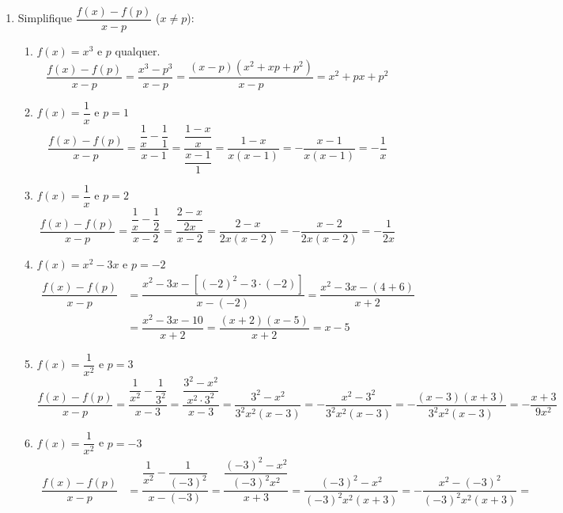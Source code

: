 \begin{enumerate}
\begin{enumerate}
	\end{enumerate}
\item %
	Simplifique $\dfrac{f(x)-f(p)}{x-p}$ ($x\neq p$):
	\begin{enumerate}
		\addtocounter{enumii}{8}
		\item %
		$f(x)=x^3$ e $p$ qualquer.
		\begin{equation*}
		\dfrac{f(x)-f(p)}{x-p}=\dfrac{x^3-p^3}{x-p}=\dfrac{(x-p)(x^2+xp+p^2)}{x-p}=x^2+px+p^2		
		\end{equation*}
		\item %
		$f(x)=\dfrac{1}{x}$ e $p=1$
		\begin{equation*}
		\dfrac{f(x)-f(p)}{x-p} = \dfrac{\dfrac{1}{x}-\dfrac{1}{1}}{x-1	}=\dfrac{\dfrac{1-x}{x}}{\dfrac{x-1}{1}}=\dfrac{1-x}{x(x-1)}=-\dfrac{x-1}{x(x-1)}=-\dfrac{1}{x}
		\end{equation*}
		\addtocounter{enumii}{1}
		\item %
		$f(x)=\dfrac{1}{x}$ e $p=2$
		\begin{equation*}		
		\dfrac{f(x)-f(p)}{x-p} = \dfrac{\dfrac{1}{x}-\dfrac{1}{2}}{x-2}=\dfrac{\dfrac{2-x}{2x}}{x-2}=\dfrac{2-x}{2x(x-2)}=-\dfrac{x-2}{2x(x-2)}=-\dfrac{1}{2x}
		\end{equation*}
		\item %
		$f(x)=x^2-3x$ e $p=-2$
		\begin{equation*}
		\begin{split}
		\dfrac{f(x)-f(p)}{x-p}&= \dfrac{x^2-3x-[(-2)^2-3\cdot(-2)]}{x-(-2)}=\dfrac{x^2-3x-(4+6)}{x+2}\\
		 					   &= \dfrac{x^2-3x-10}{x+2}=\dfrac{(x+2)(x-5)}{x+2}=x-5
		\end{split}
		\end{equation*}
		\item %
		$f(x)=\dfrac{1}{x^2}$ e $p=3$
		\begin{equation*}
		\dfrac{f(x)-f(p)}{x-p} = \dfrac{\dfrac{1}{x^2}-\dfrac{1}{3^2}}{x-3}=\dfrac{\dfrac{3^2-x^2}{x^2\cdot3^2}}{x-3}=\dfrac{3^2-x^2}{3^2x^2(x-3)}=-\dfrac{x^2-3^2}{3^2x^2(x-3)}=-\dfrac{(x-3)(x+3)}{3^2x^2(x-3)}=-\dfrac{x+3}{9x^2}
		\end{equation*}
		\item %
		$f(x)=\dfrac{1}{x^2}$ e $p=-3$
		\begin{equation*}
		\begin{split}
		\dfrac{f(x)-f(p)}{x-p}&=\dfrac{\dfrac{1}{x^2}-\dfrac{1}{(-3)^2}}{x-(-3)}=\dfrac{\dfrac{(-3)^2-x^2}{(-3)^2x^2}}{x+3}=\dfrac{(-3)^2-x^2}{(-3)^2x^2(x+3)}=-\dfrac{x^2-(-3)^2}{(-3)^2x^2(x+3)}=\\

\end{split}
\end{equation*}
\end{enumerate}
\end{enumerate}

